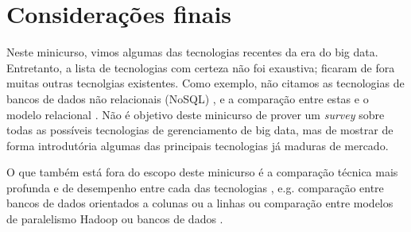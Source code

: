 \section{Considerações finais}
\label{sec:final}

Neste minicurso, vimos algumas das tecnologias recentes da era do big data. Entretanto, 
a lista de tecnologias com certeza não foi exaustiva; ficaram de fora muitas outras
tecnolgias existentes. Como exemplo, não citamos as tecnologias de bancos de dados
não relacionais (NoSQL) \citep{han2011survey}, e a comparação entre estas e 
o modelo relacional \citep{cattell2011scalable, stonebraker2010sql, stonebraker2012newsql}.
Não é objetivo deste minicurso de prover um \textit{survey} sobre todas as
possíveis tecnologias de gerenciamento de big data, mas de mostrar de forma introdutória
algumas das principais tecnologias já maduras de mercado.

O que também está fora do escopo deste minicurso é a comparação técnica mais profunda e 
de desempenho entre cada das tecnologias \citep{Pavlo2009}, e.g. comparação entre 
bancos de dados orientados a colunas ou a linhas \citep{Abadi2008} ou comparação entre
modelos de paralelismo Hadoop ou bancos de dados \citep{Stonebraker2010}. 

